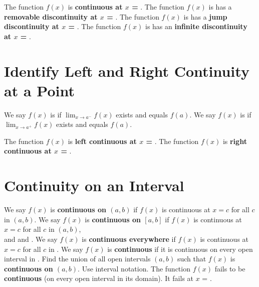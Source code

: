 \documentclass[10pt, addpoints]{exam}
\begin{document}
\begin{questions}
\question The function $f(x)$ is \textbf{continuous at \boldmath $x$ =} \fillin[][3in].
\question The function $f(x)$ is has a \textbf{removable discontinuity at \boldmath $x$ =} \fillin[][3in].
\question The function $f(x)$ is has a \textbf{jump discontinuity at \boldmath $x$ =} \fillin[][3in].
\question The function $f(x)$ is has an \textbf{infinite discontinuity at \boldmath $x$ =} \fillin[][3in].

\section{Identify Left and Right Continuity at a Point}
\question We say $f(x)$ is \fillin[left continuous at $x=a$][3in] if $\lim_{x\to a^-}f(x)$ exists and equals $f(a)$.
\question We say $f(x)$ is \fillin[right continuous at $x=a$][3in] if $\lim_{x\to a^+}f(x)$ exists and equals $f(a)$.

\question The function $f(x)$ is \textbf{left continuous at \boldmath $x$ =} \fillin[][3in].
\question The function $f(x)$ is \textbf{right continuous at \boldmath $x$ =} \fillin[][3in].

\section{Continuity on an Interval}
We say $f(x)$ is \textbf{continuous on \boldmath $(a,b)$}
	if $f(x)$ is continuous at $x=c$ for all $c$ in $(a,b)$.
\question We say $f(x)$ is \textbf{continuous on \boldmath $[a,b]$}
	if $f(x)$ is continuous at $x=c$ for all $c$ in $(a,b)$, \\[3ex]
	and \fillin[right continuous at $x=a$][3in]
	and \fillin[left continuous at $x=a$][3in].
\question We say $f(x)$ is \textbf{continuous everywhere}
	if $f(x)$ is continuous at $x=c$ for all $c$ in \fillin[][1in].
\question We say $f(x)$ is \textbf{continuous} if it is continuous on every open interval in \fillin[][2.5in].
\question Find the union of all open intervals $(a,b)$ such that $f(x)$
	is \textbf{continuous on \boldmath $(a,b)$}. Use interval notation.
\question The function $f(x)$ fails to be \textbf{continuous} (on every open interval in its domain). 
	It fails at $x$ = \fillin[][1.4in].

\end{questions}
\end{document}

